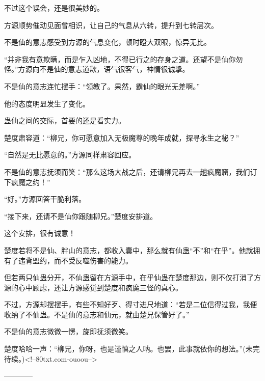\begin{this_body}
不过这个误会，还是很美妙的。

方源顺势催动见面曾相识，让自己的气息从六转，提升到七转层次。

不是仙的意志感受到方源的气息变化，顿时瞪大双眼，惊异无比。

“并非我有意欺瞒，而是乍入凶地，不得已行之的存身之道。还望不是仙你勿怪。”方源向不是仙的意志道歉，语气很客气，神情很诚挚。

不是仙的意志连忙摆手：“领教了。果然，霸仙的眼光无差啊。”

他的态度明显发生了变化。

蛊仙之间的交际，首要的还是看实力。

楚度肃容道：“柳兄，你可愿意加入无极魔尊的晚年成就，探寻永生之秘？”

“自然是无比愿意的。”方源同样肃容回应。

不是仙的意志抚须而笑：“那么这场大战之后，还请柳兄再去一趟疯魔窟，我们订下疯魔之约！”

“好。”方源回答干脆利落。

“接下来，还请不是仙你跟随柳兄。”楚度安排道。

这个安排，很有诚意！

楚度若将不是仙、胖山的意志，都收入囊中，那么就有仙蛊“不”和“在乎”。他就拥有了违背盟约，而不受反噬伤害的能力。

但若两只仙蛊分开，不仙蛊留在方源手中，在乎仙蛊在楚度那边，则不仅打消了方源的心中顾虑，还让方源感觉到楚度和疯魔三怪的真心。

不过，方源却摆摆手，有些不知好歹、得寸进尺地道：“若是二位信得过我，我便收纳了不仙蛊。不是仙的意志和仙元，就由楚兄保管好了。”

不是仙的意志微微一愣，旋即抚须微笑。

楚度哈哈一声：“柳兄，你呀，也是谨慎之人呐。也罢，此事就依你的想法。”(未完待续。)<!--80txt.com-ouoou-->

------------

\end{this_body}

